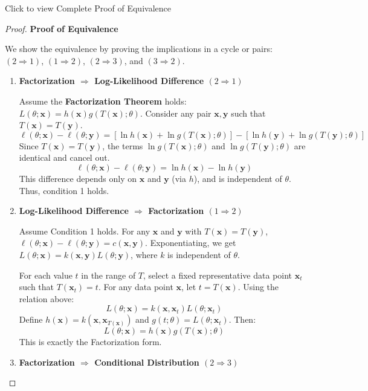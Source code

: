 \documentclass[
  letterpaper,
  DIV=11,
  numbers=noendperiod]{scrreprt}
\renewcommand{\[}{\begin{equation}}
\renewcommand{\]}{\end{equation}}
\theoremstyle{definition}
\theoremstyle{plain}
\theoremstyle{plain}
\theoremstyle{plain}
\theoremstyle{definition}
\theoremstyle{plain}
\theoremstyle{remark}
\begin{document}
Click to view Complete Proof of Equivalence

\begin{proof}
\textbf{Proof of Equivalence}

We show the equivalence by proving the implications in a cycle or pairs:
\((2 \Rightarrow 1)\), \((1 \Rightarrow 2)\), \((2 \Rightarrow 3)\), and
\((3 \Rightarrow 2)\).

\begin{enumerate}
\def\labelenumi{\arabic{enumi}.}
\item
  \textbf{Factorization \(\Rightarrow\) Log-Likelihood Difference
  \((2 \Rightarrow 1)\)}

  Assume the \textbf{Factorization Theorem} holds:
  \(L(\theta; \mathbf{x}) = h(\mathbf{x}) g(T(\mathbf{x}); \theta)\).
  Consider any pair \(\mathbf{x}, \mathbf{y}\) such that
  \(T(\mathbf{x}) = T(\mathbf{y})\). \[
  \ell(\theta; \mathbf{x}) - \ell(\theta; \mathbf{y}) = [\ln h(\mathbf{x}) + \ln g(T(\mathbf{x}); \theta)] - [\ln h(\mathbf{y}) + \ln g(T(\mathbf{y}); \theta)]
  \] Since \(T(\mathbf{x})=T(\mathbf{y})\), the terms
  \(\ln g(T(\mathbf{x}); \theta)\) and \(\ln g(T(\mathbf{y}); \theta)\)
  are identical and cancel out. \[
  \ell(\theta; \mathbf{x}) - \ell(\theta; \mathbf{y}) = \ln h(\mathbf{x}) - \ln h(\mathbf{y})
  \] This difference depends only on \(\mathbf{x}\) and \(\mathbf{y}\)
  (via \(h\)), and is independent of \(\theta\). Thus, condition 1
  holds.
\item
  \textbf{Log-Likelihood Difference \(\Rightarrow\) Factorization
  \((1 \Rightarrow 2)\)}

  Assume Condition 1 holds. For any \(\mathbf{x}\) and \(\mathbf{y}\)
  with \(T(\mathbf{x})=T(\mathbf{y})\),
  \(\ell(\theta; \mathbf{x}) - \ell(\theta; \mathbf{y}) = c(\mathbf{x}, \mathbf{y})\).
  Exponentiating, we get
  \(L(\theta; \mathbf{x}) = k(\mathbf{x}, \mathbf{y}) L(\theta; \mathbf{y})\),
  where \(k\) is independent of \(\theta\).

  For each value \(t\) in the range of \(T\), select a fixed
  representative data point \(\mathbf{x}_t\) such that
  \(T(\mathbf{x}_t) = t\). For any data point \(\mathbf{x}\), let
  \(t = T(\mathbf{x})\). Using the relation above: \[
  L(\theta; \mathbf{x}) = k(\mathbf{x}, \mathbf{x}_t) L(\theta; \mathbf{x}_t)
  \] Define
  \(h(\mathbf{x}) = k(\mathbf{x}, \mathbf{x}_{T(\mathbf{x})})\) and
  \(g(t; \theta) = L(\theta; \mathbf{x}_t)\). Then: \[
  L(\theta; \mathbf{x}) = h(\mathbf{x}) g(T(\mathbf{x}); \theta)
  \] This is exactly the Factorization form.
\item
  \textbf{Factorization \(\Rightarrow\) Conditional Distribution
  \((2 \Rightarrow 3)\)}


\end{enumerate}
\end{proof}
\end{document}
